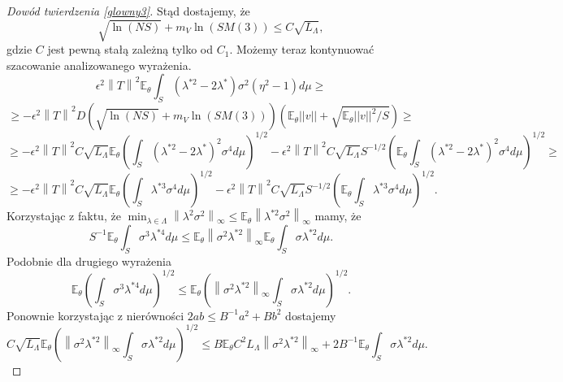 \documentclass{mwart}
\newcommand{\norm}[1]{\left\lVert#1\right\rVert}
\begin{document}
\begin{proof}[Dowód twierdzenia \ref{glowny3}]
Stąd dostajemy, że 
\begin{displaymath}
\sqrt{\ln (NS)}+m_V\ln (SM(3))\leq C\sqrt{L_{\Lambda}},
\end{displaymath}
gdzie $C$ jest pewną stałą zależną tylko od $C_1$. Możemy teraz kontynuować szacowanie analizowanego wyrażenia.
\begin{displaymath}
\epsilon^2\norm{T}^2\mathbb{E}_{\theta}\int_S(\lambda^{*2}-2\lambda^*)\sigma^2(\eta^2-1)d\mu\geq
\end{displaymath}
\begin{displaymath}
\geq  -\epsilon^2\norm{T}^2D\left(\sqrt{\ln (NS)}+m_V\ln (SM(3))\right)\left(\mathbb{E}_{\theta}||v||+\sqrt{\mathbb{E}_{\theta}||v||^2/S}\right)\geq
\end{displaymath}
\begin{displaymath}
\geq -\epsilon^2\norm{T}^2C\sqrt{L_{\Lambda}}\mathbb{E}_{\theta}\left(\int_S(\lambda^{*2}-2\lambda^*)^2\sigma^4d\mu\right)^{1/2}-\epsilon^2\norm{T}^2C\sqrt{L_{\Lambda}}S^{-1/2}\left(\mathbb{E}_{\theta}\int_S(\lambda^{*2}-2\lambda^*)^2\sigma^4 d\mu\right)^{1/2}\geq
\end{displaymath}
\begin{displaymath}
\geq -\epsilon^2\norm{T}^2C\sqrt{L_{\Lambda}}\mathbb{E}_{\theta}\left(\int_S\lambda^{*3}\sigma^4d\mu\right)^{1/2}-\epsilon^2\norm{T}^2C\sqrt{L_{\Lambda}}S^{-1/2}\left(\mathbb{E}_{\theta}\int_S\lambda^{*3}\sigma^4d\mu\right)^{1/2}.
\end{displaymath}
Korzystając z faktu, że $\min_{\lambda\in \Lambda}\norm{\lambda^2\sigma^2}_{\infty}\leq \mathbb{E}_{\theta}\norm{\lambda^{*2}\sigma^2}_{\infty}$ mamy, że
\begin{displaymath}
S^{-1}\mathbb{E}_{\theta}\int_S\sigma^3\lambda^{*4}d\mu\leq 
 \mathbb{E}_{\theta}\norm{\sigma^2\lambda^{*2}}_{\infty}\mathbb{E}_{\theta}\int_S\sigma\lambda^{*2}d\mu.
\end{displaymath}
Podobnie dla drugiego wyrażenia
\begin{displaymath}
\mathbb{E}_{\theta}\left(\int_S\sigma^3\lambda^{*4}d\mu\right)^{1/2}\leq \mathbb{E}_{\theta}\left(\norm{\sigma^2\lambda^{*2}}_{\infty}\int_S\sigma\lambda^{*2}d\mu\right)^{1/2}.
\end{displaymath}
Ponownie korzystając z nierówności $2ab\leq B^{-1}a^2+Bb^2$ dostajemy
\begin{displaymath}
C\sqrt{L_{\Lambda}}\mathbb{E}_{\theta}\left(\norm{\sigma^2\lambda^{*2}}_{\infty}\int_S\sigma\lambda^{*2}d\mu\right)^{1/2}
\leq B\mathbb{E}_{\theta}C^2L_{\Lambda}\norm{\sigma^2\lambda^{*2}}_{\infty}+2B^{-1}\mathbb{E}_{\theta}\int_S\sigma\lambda^{*2}d\mu.

\end{displaymath}
\end{proof}
\end{document}
